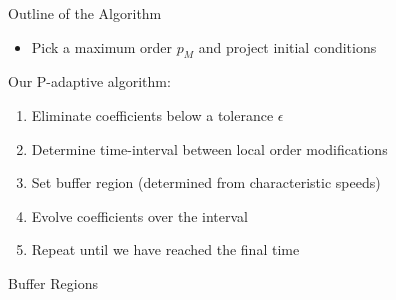 \documentclass[sansserif]{beamer}
\begin{document}
\begin{frame}{Outline of the Algorithm}
\begin{itemize}
 \item Pick a maximum order $p_M$ and project initial conditions
\end{itemize}
Our P-adaptive algorithm:
\begin{enumerate}
 \item Eliminate coefficients below a tolerance $\epsilon$
 \item Determine time-interval between local order modifications
 \item Set buffer region (determined from characteristic speeds)
 \item Evolve coefficients over the interval
 \item Repeat until we have reached the final time
\end{enumerate}
\end{frame}

\begin{frame}{Buffer Regions}
\end{frame}
\end{document}
